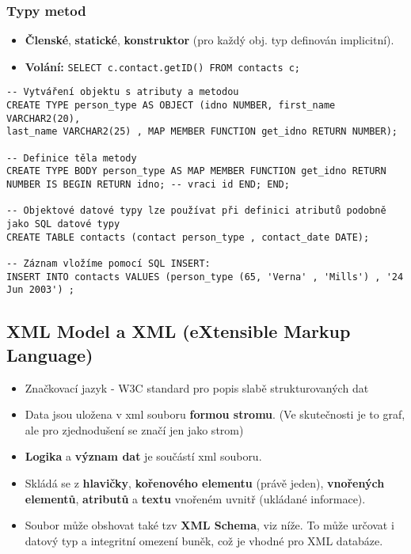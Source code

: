 \subsubsection{Typy metod}
\begin{itemize}
	\item \textbf{Členské}, \textbf{statické}, \textbf{konstruktor} (pro každý obj. typ definován implicitní).
	\item \textbf{Volání:} \texttt{SELECT c.contact.getID() FROM contacts c;}
\end{itemize}

\begin{verbatim}
-- Vytváření objektu s atributy a metodou
CREATE TYPE person_type AS OBJECT (idno NUMBER, first_name VARCHAR2(20), 
last_name VARCHAR2(25) , MAP MEMBER FUNCTION get_idno RETURN NUMBER);

-- Definice těla metody
CREATE TYPE BODY person_type AS MAP MEMBER FUNCTION get_idno RETURN 
NUMBER IS BEGIN RETURN idno; -- vraci id END; END;

-- Objektové datové typy lze používat při definici atributů podobně jako SQL datové typy
CREATE TABLE contacts (contact person_type , contact_date DATE);

-- Záznam vložíme pomocí SQL INSERT:
INSERT INTO contacts VALUES (person_type (65, 'Verna' , 'Mills') , '24 Jun 2003') ;
\end{verbatim}

\subsection{XML Model a XML (eXtensible Markup Language)}
\begin{itemize}
	\item Značkovací jazyk - W3C standard pro popis slabě strukturovaných dat
	\item Data jsou uložena v xml souboru \textbf{formou stromu}. (Ve skutečnosti je to graf, ale pro zjednodušení se značí jen jako strom)
	\item \textbf{Logika} a \textbf{význam dat} je součástí xml souboru.
	\item Skládá se z \textbf{hlavičky}, \textbf{kořenového elementu} (právě jeden), \textbf{vnořených elementů}, \textbf{atributů} a \textbf{textu} vnořeném uvnitř (ukládané informace).
	\item Soubor může obshovat také tzv \textbf{XML Schema}, viz níže. To může určovat i datový typ a integritní omezení buněk, což je vhodné pro XML databáze.
\end{itemize}


